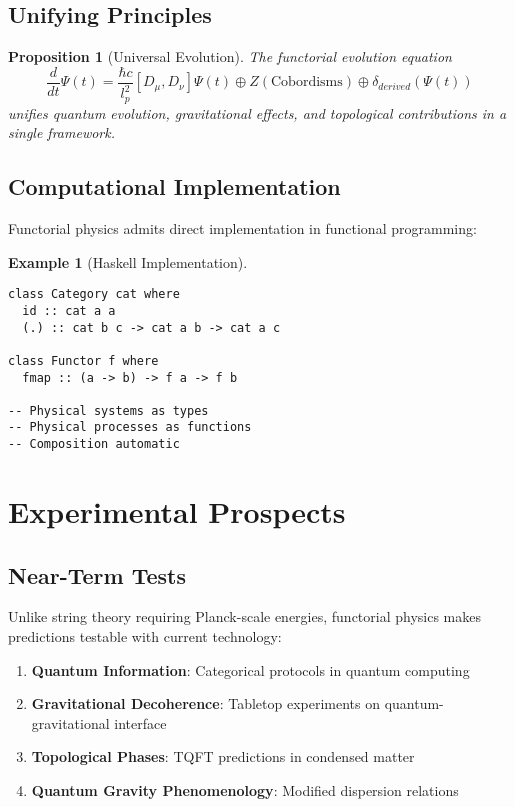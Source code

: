 \documentclass[11pt,a4paper]{article}
\newtheorem{proposition}[theorem]{Proposition}
\newtheorem{example}[theorem]{Example}
\begin{document}
\subsection{Unifying Principles}

\begin{proposition}[Universal Evolution]
The functorial evolution equation
\[
\frac{d}{dt}\Psi(t) = \frac{\hbar c}{l_p^2}[D_\mu, D_\nu]\Psi(t) \oplus Z(\text{Cobordisms}) \oplus \delta_{derived}(\Psi(t))
\]
unifies quantum evolution, gravitational effects, and topological contributions in a single framework.
\end{proposition}

\subsection{Computational Implementation}

Functorial physics admits direct implementation in functional programming:

\begin{example}[Haskell Implementation]
\begin{verbatim}
class Category cat where
  id :: cat a a
  (.) :: cat b c -> cat a b -> cat a c

class Functor f where
  fmap :: (a -> b) -> f a -> f b
  
-- Physical systems as types
-- Physical processes as functions
-- Composition automatic
\end{verbatim}
\end{example}

\section{Experimental Prospects}

\subsection{Near-Term Tests}

Unlike string theory requiring Planck-scale energies, functorial physics makes predictions testable with current technology:

\begin{enumerate}
    \item \textbf{Quantum Information}: Categorical protocols in quantum computing
    \item \textbf{Gravitational Decoherence}: Tabletop experiments on quantum-gravitational interface
    \item \textbf{Topological Phases}: TQFT predictions in condensed matter
    \item \textbf{Quantum Gravity Phenomenology}: Modified dispersion relations
\end{enumerate}
\end{document}

